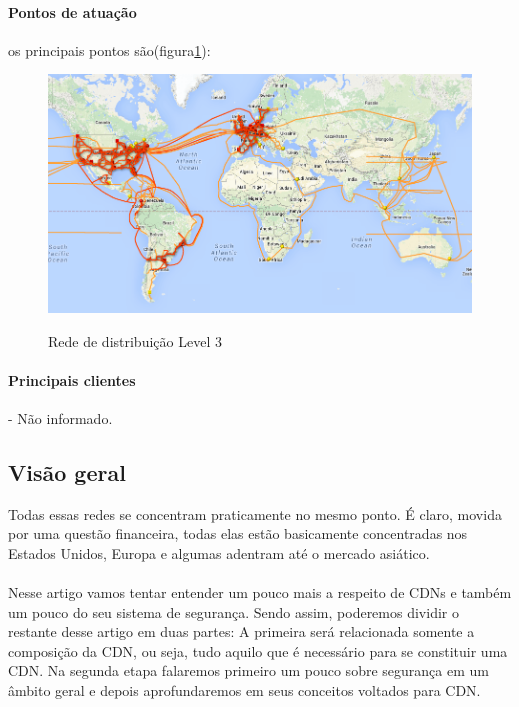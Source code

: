 \paragraph{Pontos de atua\c{c}\~ao}os principais pontos s\~ao(figura\ref{figura:level3_map}):
\begin{figure}[H]
\caption{Rede de distribui\c{c}\~ao Level 3}
\includegraphics[width=14cm]{Figuras/level3_map.png} 
\label{figura:level3_map}
\end{figure}
\paragraph{Principais clientes}- N\~ao informado.
\subsection{Vis\~ao geral}
Todas essas redes se concentram praticamente no mesmo ponto. \'E claro, movida por uma quest\~ao financeira, todas elas est\~ao basicamente concentradas nos Estados Unidos, Europa e algumas adentram at\'e o mercado asi\'atico.
\paragraph{}
Nesse artigo vamos tentar entender um pouco mais a respeito de CDNs e tamb\'em um pouco do seu sistema de seguran\c{c}a. Sendo assim, poderemos dividir o restante desse artigo em duas partes: A primeira ser\'a relacionada somente a composi\c{c}\~ao da CDN, ou seja, tudo aquilo que \'e necess\'ario para se constituir uma CDN. Na segunda etapa falaremos primeiro um pouco sobre seguran\c{c}a em um \^ambito geral e depois aprofundaremos em seus conceitos voltados para CDN.